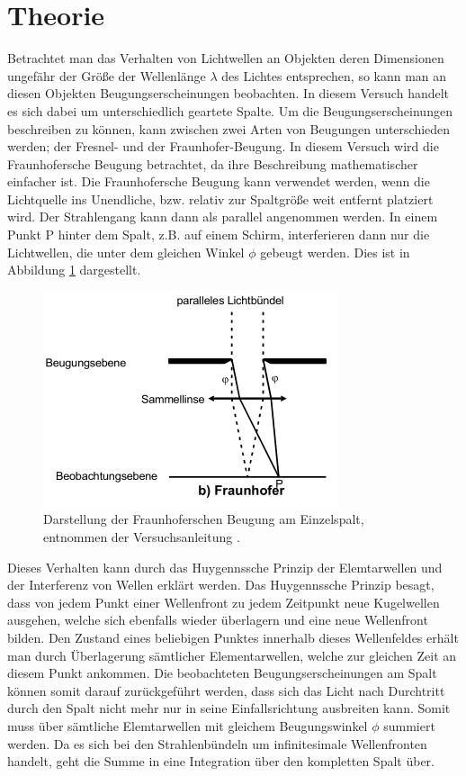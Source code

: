 \section{Theorie}
\label{sec:Theorie}

Betrachtet man das Verhalten von Lichtwellen an Objekten deren Dimensionen ungefähr der Größe der Wellenlänge $\lambda$ des Lichtes entsprechen, so kann man an diesen Objekten Beugungserscheinungen beobachten.
In diesem Versuch handelt es sich dabei um unterschiedlich geartete Spalte.
Um die Beugungserscheinungen beschreiben zu können, kann zwischen zwei Arten von Beugungen unterschieden werden; der Fresnel- und der Fraunhofer-Beugung.
In diesem Versuch wird die Fraunhofersche Beugung betrachtet, da ihre Beschreibung mathematischer einfacher ist.
Die Fraunhofersche Beugung kann verwendet werden, wenn die Lichtquelle ins Unendliche, bzw. relativ zur Spaltgröße weit entfernt platziert wird.
Der Strahlengang kann dann als parallel angenommen werden.
In einem Punkt P hinter dem Spalt, z.B. auf einem Schirm, interferieren dann nur die Lichtwellen, die unter dem gleichen Winkel $\phi$ gebeugt werden.
Dies ist in Abbildung \ref{fig:Fraunhofer} dargestellt.

\begin{figure}
  \centering
  \includegraphics{images/Fraunhofer.png}
  \caption{Darstellung der Fraunhoferschen Beugung am Einzelspalt, entnommen der Versuchsanleitung \cite[31]{1}.}
  \label{fig:Fraunhofer}
\end{figure}

Dieses Verhalten kann durch das Huygennssche Prinzip der Elemtarwellen und der Interferenz von Wellen erklärt werden.
Das Huygennssche Prinzip besagt, dass von jedem Punkt einer Wellenfront zu jedem Zeitpunkt neue Kugelwellen ausgehen, welche sich ebenfalls wieder überlagern und eine neue Wellenfront bilden.
Den Zustand eines beliebigen Punktes innerhalb dieses Wellenfeldes erhält man durch Überlagerung sämtlicher Elementarwellen, welche zur gleichen Zeit an diesem Punkt ankommen.
Die beobachteten Beugungserscheinungen am Spalt können somit darauf zurückgeführt werden, dass sich das Licht nach Durchtritt durch den Spalt nicht mehr nur in seine Einfallsrichtung ausbreiten kann.
Somit muss über sämtliche Elemtarwellen mit gleichem Beugungswinkel $\phi$ summiert werden.
Da es sich bei den Strahlenbündeln um infinitesimale Wellenfronten handelt, geht die Summe in eine Integration über den kompletten Spalt über.


